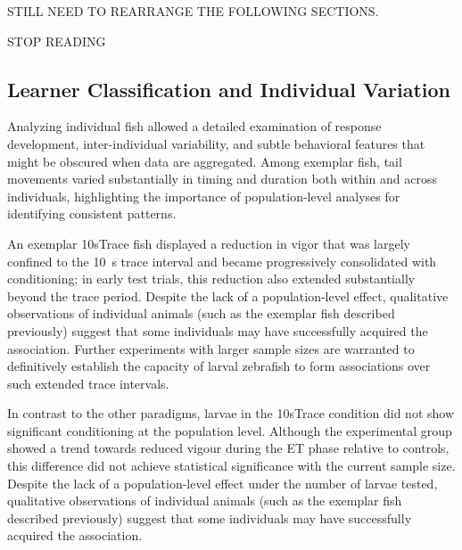 STILL NEED TO REARRANGE THE FOLLOWING SECTIONS.


STOP READING

\subsection{Learner Classification and Individual Variation}




Analyzing individual fish allowed a detailed examination of response development, inter-individual variability, and subtle behavioral features that might be obscured when data are aggregated. Among exemplar fish, tail movements varied substantially in timing and duration both within and across individuals, highlighting the importance of population-level analyses for identifying consistent patterns.


An exemplar 10sTrace fish displayed a reduction in vigor that was largely confined to the \SI{10}{\second} trace interval and became progressively consolidated with conditioning; in early test trials, this reduction also extended substantially beyond the trace period.
Despite the lack of a population-level effect, qualitative observations of individual animals (such as the exemplar fish described previously) suggest that some individuals may have successfully acquired the association. Further experiments with larger sample sizes are warranted to definitively establish the capacity of larval zebrafish to form associations over such extended trace intervals.

In contrast to the other paradigms, larvae in the 10sTrace condition did not show significant conditioning at the population level.
Although the experimental group showed a trend towards reduced vigour during the ET phase relative to controls, this difference did not achieve statistical significance with the current sample size.
Despite the lack of a population-level effect under the number of larvae tested, qualitative observations of individual animals (such as the exemplar fish described previously) suggest that some individuals may have successfully acquired the association.





